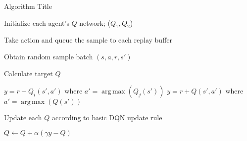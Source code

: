 \documentclass[a4paper,11pt]{article}
\DeclareMathOperator*{\argmax}{arg\,max}
\begin{document}
 
\begin{algorithm}
	\caption{Algorithm Title} 
	\begin{algorithmic}[1]
	
		\State Initialize each agent's $Q$ network; ($Q_1, Q_2$)
		
		
		
		\State Take action and queue the sample to each replay buffer
	
		\State Obtain random sample batch $(s,a,r,s')$

		\State Calculate target $Q$

			 \State \quad $y = r + Q_i(s', a')$ where $a' = \argmax(Q_j(s'))$ 
		\Else
			 \State \quad $y = r + Q(s', a')$ where $a' = \argmax(Q(s'))$ 
		
		\EndIf
			 
		\State Update each $Q$ according to basic DQN update rule
		
		\State \quad $Q \leftarrow Q + \alpha( \gamma y - Q ) $
			
		\EndWhile
		
	\end{algorithmic} 
\end{algorithm}
\end{document}
